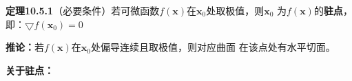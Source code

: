 
{\bf 定理10.5.1}（必要条件）若可微函数$f(\bm{x})$在$\bm{x}_0$处取极值，则$\bm{x}_0$
为$f(\bm{x})$的{\bf 驻点}，即：$\bigtriangledown f(\bm{x}_0)=0$

{\bf 推论：}若$f(\bm{x})$在$\bm{x}_0$处偏导连续且取极值，则对应曲面
在该点处有水平切面。

{\bf 关于驻点：}

\begin{center}
	\quad
	

\end{center}

